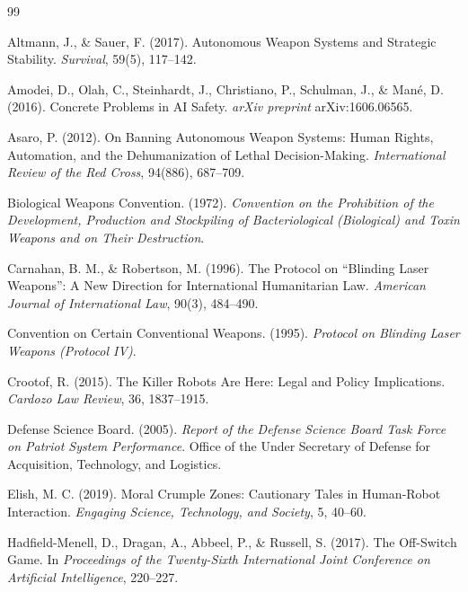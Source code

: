 \documentclass[11pt]{article}
\begin{document}
\begin{thebibliography}{99}
\setlength{\itemsep}{0.25em}

Altmann, J., \& Sauer, F. (2017). Autonomous Weapon Systems and Strategic Stability. \textit{Survival}, 59(5), 117--142.

Amodei, D., Olah, C., Steinhardt, J., Christiano, P., Schulman, J., \& Man\'{e}, D. (2016). Concrete Problems in AI Safety. \textit{arXiv preprint} arXiv:1606.06565.

Asaro, P. (2012). On Banning Autonomous Weapon Systems: Human Rights, Automation, and the Dehumanization of Lethal Decision-Making. \textit{International Review of the Red Cross}, 94(886), 687--709.

Biological Weapons Convention. (1972). \textit{Convention on the Prohibition of the Development, Production and Stockpiling of Bacteriological (Biological) and Toxin Weapons and on Their Destruction}.

Carnahan, B. M., \& Robertson, M. (1996). The Protocol on ``Blinding Laser Weapons'': A New Direction for International Humanitarian Law. \textit{American Journal of International Law}, 90(3), 484--490.

Convention on Certain Conventional Weapons. (1995). \textit{Protocol on Blinding Laser Weapons (Protocol IV)}.

Crootof, R. (2015). The Killer Robots Are Here: Legal and Policy Implications. \textit{Cardozo Law Review}, 36, 1837--1915.

Defense Science Board. (2005). \textit{Report of the Defense Science Board Task Force on Patriot System Performance}. Office of the Under Secretary of Defense for Acquisition, Technology, and Logistics.

Elish, M. C. (2019). Moral Crumple Zones: Cautionary Tales in Human-Robot Interaction. \textit{Engaging Science, Technology, and Society}, 5, 40--60.

Hadfield-Menell, D., Dragan, A., Abbeel, P., \& Russell, S. (2017). The Off-Switch Game. In \textit{Proceedings of the Twenty-Sixth International Joint Conference on Artificial Intelligence}, 220--227.


\end{thebibliography}
\end{document}
